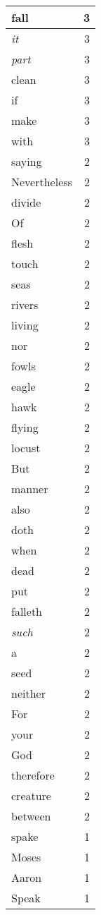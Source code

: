 \begin{center}
\begin{longtable}{l|r}
fall & 3 \\ \hline
\emph{it} & 3 \\ \hline
\emph{part} & 3 \\ \hline
clean & 3 \\ \hline
if & 3 \\ \hline
make & 3 \\ \hline
with & 3 \\ \hline
saying & 2 \\ \hline
Nevertheless & 2 \\ \hline
divide & 2 \\ \hline
Of & 2 \\ \hline
flesh & 2 \\ \hline
touch & 2 \\ \hline
seas & 2 \\ \hline
rivers & 2 \\ \hline
living & 2 \\ \hline
nor & 2 \\ \hline
fowls & 2 \\ \hline
eagle & 2 \\ \hline
hawk & 2 \\ \hline
flying & 2 \\ \hline
locust & 2 \\ \hline
But & 2 \\ \hline
manner & 2 \\ \hline
also & 2 \\ \hline
doth & 2 \\ \hline
when & 2 \\ \hline
dead & 2 \\ \hline
put & 2 \\ \hline
falleth & 2 \\ \hline
\emph{such} & 2 \\ \hline
a & 2 \\ \hline
seed & 2 \\ \hline
neither & 2 \\ \hline
For & 2 \\ \hline
your & 2 \\ \hline
God & 2 \\ \hline
therefore & 2 \\ \hline
creature & 2 \\ \hline
between & 2 \\ \hline
spake & 1 \\ \hline
Moses & 1 \\ \hline
Aaron & 1 \\ \hline
Speak & 1 \\ \hline

\end{longtable}
\end{center}

